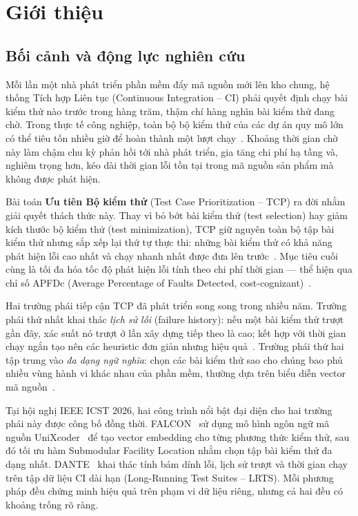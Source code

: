 \section{Giới thiệu}
\label{sec:introduction}

\subsection{Bối cảnh và động lực nghiên cứu}
\label{subsec:background}

Mỗi lần một nhà phát triển phần mềm đẩy mã nguồn mới lên kho chung, hệ thống Tích hợp Liên tục (Continuous Integration -- CI) phải quyết định chạy bài kiểm thử nào trước trong hàng trăm, thậm chí hàng nghìn bài kiểm thử đang chờ. Trong thực tế công nghiệp, toàn bộ bộ kiểm thử của các dự án quy mô lớn có thể tiêu tốn nhiều giờ để hoàn thành một lượt chạy~\cite{memon2017taming}. Khoảng thời gian chờ này làm chậm chu kỳ phản hồi tới nhà phát triển, gia tăng chi phí hạ tầng và, nghiêm trọng hơn, kéo dài thời gian lỗi tồn tại trong mã nguồn sản phẩm mà không được phát hiện.

Bài toán \textbf{Ưu tiên Bộ kiểm thử} (Test Case Prioritization -- TCP) ra đời nhằm giải quyết thách thức này. Thay vì bỏ bớt bài kiểm thử (test selection) hay giảm kích thước bộ kiểm thử (test minimization), TCP giữ nguyên toàn bộ tập bài kiểm thử nhưng sắp xếp lại thứ tự thực thi: những bài kiểm thử có khả năng phát hiện lỗi cao nhất và chạy nhanh nhất được đưa lên trước~\cite{rothermel1999tcp, yoo2012regression}. Mục tiêu cuối cùng là tối đa hóa tốc độ phát hiện lỗi tính theo chi phí thời gian --- thể hiện qua chỉ số APFDc (Average Percentage of Faults Detected, cost-cognizant)~\cite{elbaum2001incorporating}.

Hai trường phái tiếp cận TCP đã phát triển song song trong nhiều năm. Trường phái thứ nhất khai thác \textit{lịch sử lỗi} (failure history): nếu một bài kiểm thử trượt gần đây, xác suất nó trượt ở lần xây dựng tiếp theo là cao; kết hợp với thời gian chạy ngắn tạo nên các heuristic đơn giản nhưng hiệu quả~\cite{kim2002history, spieker2017reinforcement}. Trường phái thứ hai tập trung vào \textit{đa dạng ngữ nghĩa}: chọn các bài kiểm thử sao cho chúng bao phủ nhiều vùng hành vi khác nhau của phần mềm, thường dựa trên biểu diễn vector mã nguồn~\cite{henard2016comparing, miranda2018fast}.

Tại hội nghị IEEE ICST 2026, hai công trình nổi bật đại diện cho hai trường phái này được công bố đồng thời. FALCON~\cite{falcon2026} sử dụng mô hình ngôn ngữ mã nguồn UniXcoder~\cite{guo2022unixcoder} để tạo vector embedding cho từng phương thức kiểm thử, sau đó tối ưu hàm Submodular Facility Location nhằm chọn tập bài kiểm thử đa dạng nhất. DANTE~\cite{dante2026} khai thác tính bám dính lỗi, lịch sử trượt và thời gian chạy trên tập dữ liệu CI dài hạn (Long-Running Test Suites -- LRTS). Mỗi phương pháp đều chứng minh hiệu quả trên phạm vi dữ liệu riêng, nhưng cả hai đều có khoảng trống rõ ràng.

